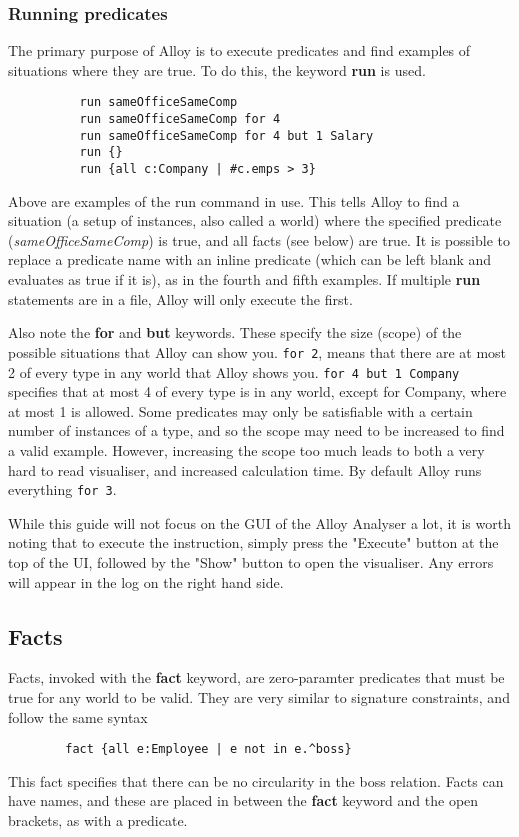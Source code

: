 \documentclass[10pt]{article}
\begin{document}
      \subsubsection*{Running predicates}
        The primary purpose of Alloy is to execute predicates and find examples of situations where they are true. To do this, the keyword \textbf{run} is used.
        \begin{verbatim}
          run sameOfficeSameComp
          run sameOfficeSameComp for 4
          run sameOfficeSameComp for 4 but 1 Salary
          run {}
          run {all c:Company | #c.emps > 3}
        \end{verbatim}
        Above are examples of the run command in use. This tells Alloy to find a situation (a setup of instances, also called a world) where the specified predicate (\textit{sameOfficeSameComp}) is true, and all facts (see below) are true. It is possible to replace a predicate name with an inline predicate (which can be left blank and evaluates as true if it is), as in the fourth and fifth examples. If multiple \textbf{run} statements are in a file, Alloy will only execute the first.\par
        Also note the \textbf{for} and \textbf{but} keywords. These specify the size (scope) of the possible situations that Alloy can show you. \lstinline|for 2|, means that there are at most 2 of every type in any world that Alloy shows you. \lstinline|for 4 but 1 Company| specifies that at most 4 of every type is in any world, except for Company, where at most 1 is allowed. Some predicates may only be satisfiable with a certain number of instances of a type, and so the scope may need to be increased to find a valid example. However, increasing the scope too much leads to both a very hard to read visualiser, and increased calculation time. By default Alloy runs everything \lstinline|for 3|.\par
        While this guide will not focus on the GUI of the Alloy Analyser a lot, it is worth noting that to execute the instruction, simply press the "Execute" button at the top of the UI, followed by the "Show" button to open the visualiser. Any errors will appear in the log on the right hand side.
    \subsection*{Facts}
      Facts, invoked with the \textbf{fact} keyword, are zero-paramter predicates that must be true for any world to be valid. They are very similar to signature constraints, and follow the same syntax
      \begin{verbatim}
        fact {all e:Employee | e not in e.^boss}
      \end{verbatim}
      This fact specifies that there can be no circularity in the boss relation. Facts can have names, and these are placed in between the \textbf{fact} keyword and the open brackets, as with a predicate.
\end{document}

